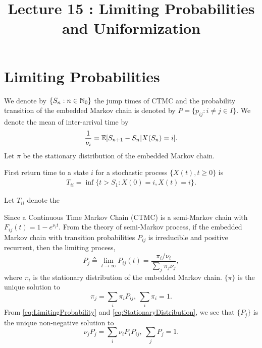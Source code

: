 \documentclass[a4paper,10pt,english]{article}
\title{Lecture 15 : Limiting Probabilities and Uniformization }%
\author{}
\begin{document}
\maketitle

\section{Limiting Probabilities}
We denote by $\{S_n: n \in \mathbb{N}_0\}$ the jump times of CTMC and the probability transition of the embedded Markov chain is denoted by $P = \{p_{ij}: i \neq j \in I\}$. 
We denote the mean of inter-arrival time by 
\begin{align*}
\frac{1}{\nu_i} = \mathbb{E}[S_{n+1} - S_{n}|X(S_n) = i].
\end{align*} 
Let $\pi$ be the stationary distribution of the embedded Markov chain.
\begin{defn} First return time to a state $i$ for a stochastic process $\{X(t), t \geqslant 0\}$ is 
\begin{align*}
T_{ii} = \inf\{t > S_1 : X(0) = i, X(t) = i\}.
\end{align*}
\end{defn}
\begin{thm} Let $T_{ii}$ denote the 
\end{thm}
 
Since a Continuous Time Markov Chain (CTMC) is a semi-Markov chain with $F_{ij}(t)=1-e^{\nu_i t}$. From the theory of semi-Markov process, if the embedded Markov chain with transition probabilities $P_{ij}$ is irreducible and positive recurrent, then the limiting process,
\begin{equation}
\label{eq:LimitingProbability}
 P_{j} \triangleq \lim_{t \rightarrow \infty } P_{ij}(t)= \frac{\pi_i / \nu_i}{\sum_j \pi_j \nu_j},
\end{equation}
where $\pi_i$ is the stationary distribution of the embedded Markov chain. $\{\pi\}$ is the unique solution to
\begin{equation}
\label{eq:StationaryDistribution}
\pi_j = \sum_i \pi_i P_{ij},~ \sum_{i}\pi_i = 1. 
\end{equation}
From \ref{eq:LimitingProbability} and \ref{eq:StationaryDistribution}, we see that $\{P_j\}$ is the unique non-negative solution to 
\begin{equation}
\nu_jP_j=\sum_i \nu_iP_iP_{ij},~ \sum_j P_j =1.
\end{equation}
\end{document}
